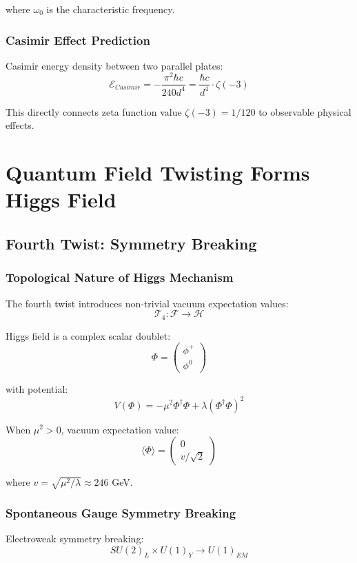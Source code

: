 \documentclass[11pt]{article}
\begin{document}
where $\omega_0$ is the characteristic frequency.

\subsubsection{Casimir Effect Prediction}

Casimir energy density between two parallel plates:
$$\mathcal{E}_{Casimir} = -\frac{\pi^2 \hbar c}{240 d^4} = \frac{\hbar c}{d^4} \cdot \zeta(-3)$$

This directly connects zeta function value $\zeta(-3) = 1/120$ to observable physical effects.

\section{Quantum Field Twisting Forms Higgs Field}

\subsection{Fourth Twist: Symmetry Breaking}

\subsubsection{Topological Nature of Higgs Mechanism}

The fourth twist introduces non-trivial vacuum expectation values:
$$\mathcal{T}_4: \mathcal{F} \to \mathcal{H}$$

Higgs field is a complex scalar doublet:
$$\Phi = \begin{pmatrix} \phi^+ \\ \phi^0 \end{pmatrix}$$

with potential:
$$V(\Phi) = -\mu^2 \Phi^{\dagger} \Phi + \lambda (\Phi^{\dagger} \Phi)^2$$

When $\mu^2 > 0$, vacuum expectation value:
$$\langle \Phi \rangle = \begin{pmatrix} 0 \\ v/\sqrt{2} \end{pmatrix}$$

where $v = \sqrt{\mu^2/\lambda} \approx 246$ GeV.

\subsubsection{Spontaneous Gauge Symmetry Breaking}

Electroweak symmetry breaking:
$$SU(2)_L \times U(1)_Y \to U(1)_{EM}$$
\end{document}
